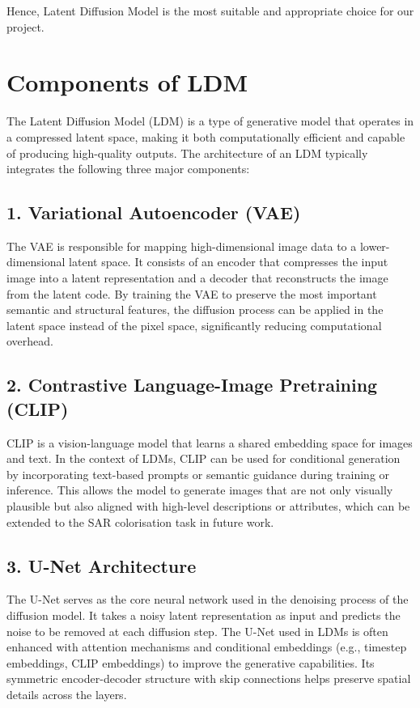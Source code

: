 Hence, Latent Diffusion Model is the most suitable and appropriate choice for our project. 

\section{Components of LDM}


The Latent Diffusion Model (LDM) is a type of generative model that operates in a compressed latent space, making it both computationally efficient and capable of producing high-quality outputs. The architecture of an LDM typically integrates the following three major components:

\subsection*{1. Variational Autoencoder (VAE)}
The VAE is responsible for mapping high-dimensional image data to a lower-dimensional latent space. It consists of an encoder that compresses the input image into a latent representation and a decoder that reconstructs the image from the latent code. By training the VAE to preserve the most important semantic and structural features, the diffusion process can be applied in the latent space instead of the pixel space, significantly reducing computational overhead.

\subsection*{2. Contrastive Language-Image Pretraining (CLIP)}
CLIP is a vision-language model that learns a shared embedding space for images and text. In the context of LDMs, CLIP can be used for conditional generation by incorporating text-based prompts or semantic guidance during training or inference. This allows the model to generate images that are not only visually plausible but also aligned with high-level descriptions or attributes, which can be extended to the SAR colorisation task in future work.

\subsection*{3. U-Net Architecture}
The U-Net serves as the core neural network used in the denoising process of the diffusion model. It takes a noisy latent representation as input and predicts the noise to be removed at each diffusion step. The U-Net used in LDMs is often enhanced with attention mechanisms and conditional embeddings (e.g., timestep embeddings, CLIP embeddings) to improve the generative capabilities. Its symmetric encoder-decoder structure with skip connections helps preserve spatial details across the layers.

